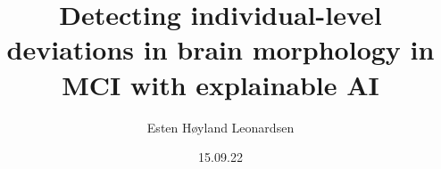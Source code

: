 \documentclass[t]{beamer}
\author{Esten H{\o}yland Leonardsen}
\institute[Life Science, UiO]{UiO:Life Science, University of Oslo}
\date{15.09.22}
\title{Detecting individual-level deviations in brain morphology in MCI with explainable AI}
\begin{document}
	\newcommand{\N}{1}

	\newcommand{\nodesize}{11pt}
	\newcommand{\hsep}{28pt}
	\newcommand{\vsep}{14pt}

	\newcommand{\arrowwidth}{0.05cm}
	\newcommand{\innerarrow}{{Latex[length=0.1cm, width=0.15cm]}}
	\newcommand{\outerarrow}{{Latex[length=0.2cm, width=0.3cm]}}

	\def\plotwidth{11.68}

	\newcommand{\mrivsep}{0.52}
	\newcommand{\mrihsep}{0.44}


	\begin{frame}
		\maketitle
	\end{frame}
\end{document}
